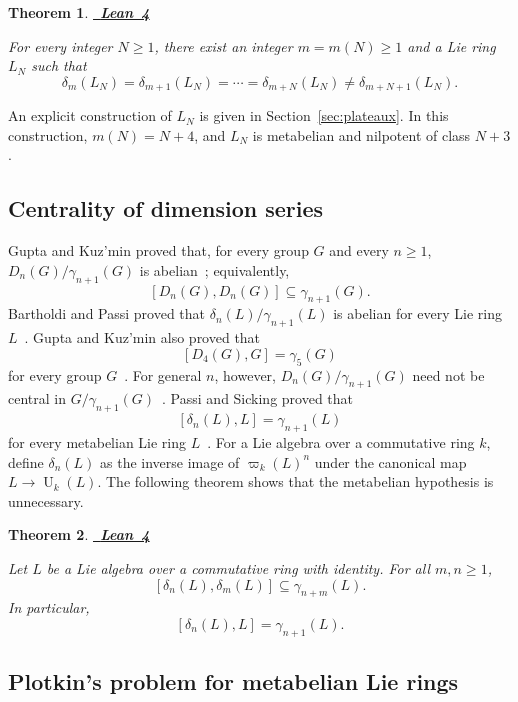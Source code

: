 \documentclass[a4paper,11pt,reqno]{amsart}
\newtheorem{maintheorem}{Theorem}
\theoremstyle{definition}
\newcommand{\leanrepository}{%
  https://github.com/TimmPeterson/lie-algebras/blob/main}
\newcommand{\leanproof}[1]{%
  \leavevmode\unskip\nobreak\hfill
  \mbox{\href{#1}{\normalfont\sffamily\bfseries\footnotesize
    \textcolor{leanblue}{Lean 4}}}%
  \par\nobreak\smallskip\noindent\ignorespaces
}
\newcommand{\U}{\operatorname U}
\begin{document}
\begin{maintheorem}\label{thm:A}
\leanproof{\leanrepository/LieRings/Publication/Results.lean\#L32-L42}
For every integer $N\geq1$, there exist an integer $m=m(N)\geq1$ and a Lie
ring $L_N$ such that
\[
 \delta_m(L_N)=\delta_{m+1}(L_N)=\cdots=\delta_{m+N}(L_N)
 \neq\delta_{m+N+1}(L_N).
\]
\end{maintheorem}

An explicit construction of $L_N$ is given in
Section~\ref{sec:plateaux}.  In this construction, $m(N)=N+4$, and $L_N$
is metabelian and nilpotent of class $N+3$.

\subsection{Centrality of dimension series}

Gupta and Kuz'min proved that, for every group $G$ and every $n\geq1$,
$D_n(G)/\gamma_{n+1}(G)$ is abelian~\cite{GuptaKuzmin1992}; equivalently,
\[
                    [D_n(G),D_n(G)]\subseteq\gamma_{n+1}(G).
\]
Bartholdi and Passi proved that
$\delta_n(L)/\gamma_{n+1}(L)$ is abelian for every Lie ring
$L$~\cite{BartholdiPassi2015}.  Gupta and Kuz'min also proved that
\[
                         [D_4(G),G]=\gamma_5(G)
\]
for every group $G$~\cite{GuptaKuzmin1992}.  For general $n$, however,
$D_n(G)/\gamma_{n+1}(G)$ need not be central in
$G/\gamma_{n+1}(G)$~\cite{GuptaKuzmin1995}.  Passi and Sicking proved
that
\[
                         [\delta_n(L),L]=\gamma_{n+1}(L)
\]
for every metabelian Lie ring $L$~\cite{PassiSicking2017}.  For a Lie
algebra over a commutative ring $k$, define $\delta_n(L)$ as
the inverse image of $\varpi_k(L)^n$ under the canonical map
$L\to\U_k(L)$.  The following theorem shows that the metabelian hypothesis
is unnecessary.

\begin{maintheorem}\label{thm:B}
\leanproof{\leanrepository/LieRings/Publication/Results.lean\#L44-L55}
Let $L$ be a Lie algebra over a commutative ring with identity.  For all
$m,n\geq1$,
\[
                 [\delta_n(L),\delta_m(L)]\subseteq\gamma_{n+m}(L).
\]
In particular,
\[
                       [\delta_n(L),L]=\gamma_{n+1}(L).
\]
\end{maintheorem}

\subsection{Plotkin's problem for metabelian Lie rings}
\end{document}
